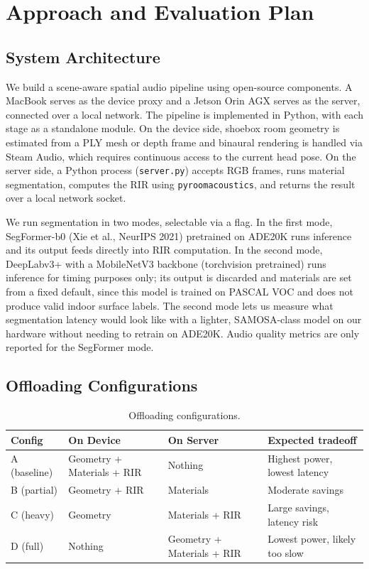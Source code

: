 \documentclass[11pt]{article}
\begin{document}
\section{Approach and Evaluation Plan}

\subsection{System Architecture}

We build a scene-aware spatial audio pipeline using open-source components.
A MacBook serves as the device proxy and a Jetson Orin AGX serves as the
server, connected over a local network. The pipeline is implemented in Python,
with each stage as a standalone module. On the device side, shoebox room
geometry is estimated from a PLY mesh or depth frame and binaural rendering
is handled via Steam Audio, which requires continuous access to the current
head pose. On the server side, a Python process (\texttt{server.py}) accepts
RGB frames, runs material segmentation, computes the RIR using
\texttt{pyroomacoustics}, and returns the result over a local network socket.

We run segmentation in two modes, selectable via a flag. In the first mode,
SegFormer-b0 (Xie et al., NeurIPS 2021) pretrained on ADE20K runs inference
and its output feeds directly into RIR computation. In the second mode,
DeepLabv3+ with a MobileNetV3 backbone (torchvision pretrained) runs inference
for timing purposes only; its output is discarded and materials are set from
a fixed default, since this model is trained on PASCAL VOC and does not produce
valid indoor surface labels. The second mode lets us measure what segmentation
latency would look like with a lighter, SAMOSA-class model on our hardware
without needing to retrain on ADE20K. Audio quality metrics are only reported
for the SegFormer mode.

\subsection{Offloading Configurations}

\begin{table}[H]
\small\centering
\caption{Offloading configurations.}
\label{tab:configs}
\begin{tabular}{@{}llll@{}}
\toprule
\textbf{Config} & \textbf{On Device} & \textbf{On Server} & \textbf{Expected tradeoff}\\
\midrule
A (baseline) & Geometry + Materials + RIR & Nothing                & Highest power, lowest latency\\
B (partial)  & Geometry + RIR             & Materials              & Moderate savings\\
C (heavy)    & Geometry                   & Materials + RIR        & Large savings, latency risk\\
D (full)     & Nothing                    & Geometry + Materials + RIR & Lowest power, likely too slow\\
\bottomrule
\end{tabular}
\end{table}
\end{document}

